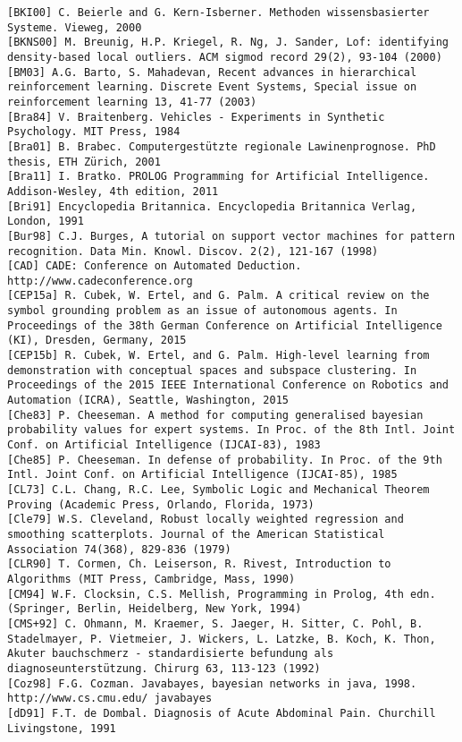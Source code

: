 \documentclass[10pt]{article}
\begin{document}
\begin{verbatim}
[BKI00] C. Beierle and G. Kern-Isberner. Methoden wissensbasierter Systeme. Vieweg, 2000
[BKNS00] M. Breunig, H.P. Kriegel, R. Ng, J. Sander, Lof: identifying density-based local outliers. ACM sigmod record 29(2), 93-104 (2000)
[BM03] A.G. Barto, S. Mahadevan, Recent advances in hierarchical reinforcement learning. Discrete Event Systems, Special issue on reinforcement learning 13, 41-77 (2003)
[Bra84] V. Braitenberg. Vehicles - Experiments in Synthetic Psychology. MIT Press, 1984
[Bra01] B. Brabec. Computergestützte regionale Lawinenprognose. PhD thesis, ETH Zürich, 2001
[Bra11] I. Bratko. PROLOG Programming for Artificial Intelligence. Addison-Wesley, 4th edition, 2011
[Bri91] Encyclopedia Britannica. Encyclopedia Britannica Verlag, London, 1991
[Bur98] C.J. Burges, A tutorial on support vector machines for pattern recognition. Data Min. Knowl. Discov. 2(2), 121-167 (1998)
[CAD] CADE: Conference on Automated Deduction. http://www.cadeconference.org
[CEP15a] R. Cubek, W. Ertel, and G. Palm. A critical review on the symbol grounding problem as an issue of autonomous agents. In Proceedings of the 38th German Conference on Artificial Intelligence (KI), Dresden, Germany, 2015
[CEP15b] R. Cubek, W. Ertel, and G. Palm. High-level learning from demonstration with conceptual spaces and subspace clustering. In Proceedings of the 2015 IEEE International Conference on Robotics and Automation (ICRA), Seattle, Washington, 2015
[Che83] P. Cheeseman. A method for computing generalised bayesian probability values for expert systems. In Proc. of the 8th Intl. Joint Conf. on Artificial Intelligence (IJCAI-83), 1983
[Che85] P. Cheeseman. In defense of probability. In Proc. of the 9th Intl. Joint Conf. on Artificial Intelligence (IJCAI-85), 1985
[CL73] C.L. Chang, R.C. Lee, Symbolic Logic and Mechanical Theorem Proving (Academic Press, Orlando, Florida, 1973)
[Cle79] W.S. Cleveland, Robust locally weighted regression and smoothing scatterplots. Journal of the American Statistical Association 74(368), 829-836 (1979)
[CLR90] T. Cormen, Ch. Leiserson, R. Rivest, Introduction to Algorithms (MIT Press, Cambridge, Mass, 1990)
[CM94] W.F. Clocksin, C.S. Mellish, Programming in Prolog, 4th edn. (Springer, Berlin, Heidelberg, New York, 1994)
[CMS+92] C. Ohmann, M. Kraemer, S. Jaeger, H. Sitter, C. Pohl, B. Stadelmayer, P. Vietmeier, J. Wickers, L. Latzke, B. Koch, K. Thon, Akuter bauchschmerz - standardisierte befundung als diagnoseunterstützung. Chirurg 63, 113-123 (1992)
[Coz98] F.G. Cozman. Javabayes, bayesian networks in java, 1998. http://www.cs.cmu.edu/ javabayes
[dD91] F.T. de Dombal. Diagnosis of Acute Abdominal Pain. Churchill Livingstone, 1991

\end{verbatim}
\end{document}
